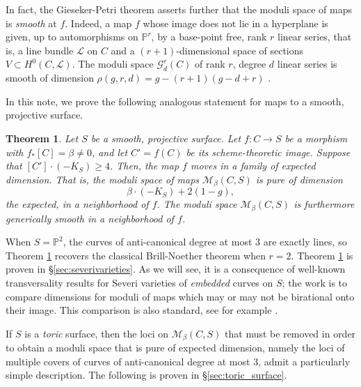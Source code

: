 \documentclass[12pt]{amsart}
\def\cG{\mathcal{G}}
\def\cM{{\mathcal{M}}}
\def\P{\mathbb{P}}
\def\cL{\mathcal{L}}
\newtheorem{theorem}[definition]{Theorem}
\def\cL{\mathcal{L}}
\begin{document}
 In fact, the Gieseker-Petri theorem asserts further that the moduli space of maps is \emph{smooth} at $f$. Indeed, a map $f$ whose image does not lie in a hyperplane is given, up to automorphisms on $\P^r$, by a base-point free, rank $r$ linear series, that is, a line bundle $\cL$ on $C$ and a $(r+1)$-dimensional space of sections $V\subset H^0(C,\cL)$. The moduli space $\cG^r_d(C)$ of rank $r$, degree $d$ linear series is smooth of dimension $\rho(g,r,d)=g-(r+1)(g-d+r)$ \cite[Theorem V.1.6]{acgh}.

In this note, we prove the following analogous statement for maps to a smooth, projective surface.

\begin{theorem}\label{thm:BN_surface}
Let $S$ be a smooth, projective surface. Let $f:C\to S$ be a morphism with $f_{*}[C]=\beta\neq0$, and let $C'=f(C)$ be its scheme-theoretic image. Suppose that $[C']\cdot (-K_S)\ge 4$. Then, the map $f$ moves in a family of expected dimension. That is, the moduli space of maps $\cM_\beta(C,S)$ is pure of dimension
    \begin{equation*}
        \beta\cdot (-K_S)+2(1-g),
    \end{equation*}
    the expected, in a neighborhood of $f$. The moduli space $\cM_\beta(C,S)$ is furthermore generically smooth in a neighborhood of $f$.
\end{theorem}

When $S=\P^2$, the curves of anti-canonical degree at most 3 are exactly lines, so Theorem \ref{thm:BN_surface} recovers the classical Brill-Noether theorem when $r=2$. Theorem \ref{thm:BN_surface} is proven in \S\ref{sec:severivarieties}. As we will see, it is a consequence of well-known transversality results for Severi varieties of \emph{embedded} curves on $S$; the work is to compare dimensions for moduli of maps which may or may not be birational onto their image. This comparison is also standard, see for example \cite[\S 3]{vakil}. 

If $S$ is a \emph{toric} surface, then the loci on $\cM_\beta(C,S)$ that must be removed in order to obtain a moduli space that is pure of expected dimension, namely the loci of multiple covers of curves of anti-canonical degree at most 3, admit a particularly simple description. The following is proven in \S\ref{sec:toric_surface}.
\end{document}
